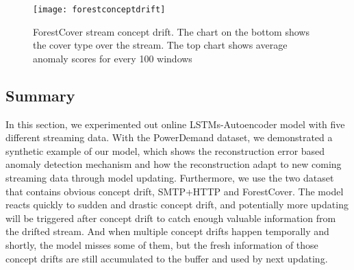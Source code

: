 \begin{figure}[h]
\centering
\texttt{[image: forestconceptdrift]}
\caption[ForestCover stream concept drift]{ ForestCover stream concept drift. The chart on the bottom shows the cover type over the stream. The top chart shows average anomaly scores for every 100 windows}
\label{fig:fcd}
\end{figure}


\subsection{Summary}
\label{sec:summary}

In this section, we experimented out online LSTMs-Autoencoder model with five different streaming data. With the PowerDemand dataset, we demonstrated a synthetic example of our model, which shows the reconstruction error based anomaly detection mechanism and how the reconstruction adapt to new coming streaming data through model updating. Furthermore, we use the two dataset that contains obvious concept drift, SMTP+HTTP and ForestCover. The model reacts quickly to sudden and drastic concept drift, and potentially more updating will be triggered after concept drift to catch enough valuable information from the drifted stream. And when multiple concept drifts happen temporally and shortly, the model misses some of them, but the fresh information of those concept drifts are still accumulated to the buffer and used by next updating.\\







